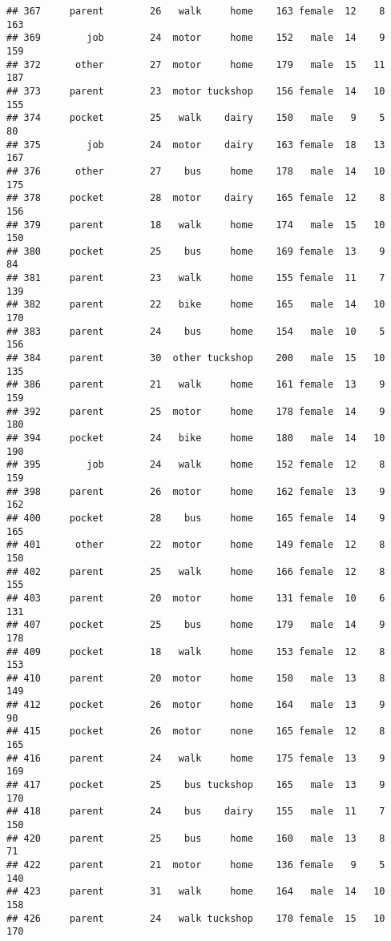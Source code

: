\documentclass[
]{article}
\begin{document}
\begin{verbatim}
## 367     parent        26   walk     home    163 female  12    8     163
## 369        job        24  motor     home    152   male  14    9     159
## 372      other        27  motor     home    179   male  15   11     187
## 373     parent        23  motor tuckshop    156 female  14   10     155
## 374     pocket        25   walk    dairy    150   male   9    5      80
## 375        job        24  motor    dairy    163 female  18   13     167
## 376      other        27    bus     home    178   male  14   10     175
## 378     pocket        28  motor    dairy    165 female  12    8     156
## 379     parent        18   walk     home    174   male  15   10     150
## 380     pocket        25    bus     home    169 female  13    9      84
## 381     parent        23   walk     home    155 female  11    7     139
## 382     parent        22   bike     home    165   male  14   10     170
## 383     parent        24    bus     home    154   male  10    5     156
## 384     parent        30  other tuckshop    200   male  15   10     135
## 386     parent        21   walk     home    161 female  13    9     159
## 392     parent        25  motor     home    178 female  14    9     180
## 394     pocket        24   bike     home    180   male  14   10     190
## 395        job        24   walk     home    152 female  12    8     159
## 398     parent        26  motor     home    162 female  13    9     162
## 400     pocket        28    bus     home    165 female  14    9     165
## 401      other        22  motor     home    149 female  12    8     150
## 402     parent        25   walk     home    166 female  12    8     155
## 403     parent        20  motor     home    131 female  10    6     131
## 407     pocket        25    bus     home    179   male  14    9     178
## 409     pocket        18   walk     home    153 female  12    8     153
## 410     parent        20  motor     home    150   male  13    8     149
## 412     pocket        26  motor     home    164   male  13    9      90
## 415     pocket        26  motor     none    165 female  12    8     165
## 416     parent        24   walk     home    175 female  13    9     169
## 417     pocket        25    bus tuckshop    165   male  13    9     170
## 418     parent        24    bus    dairy    155   male  11    7     150
## 420     parent        25    bus     home    160   male  13    8      71
## 422     parent        21  motor     home    136 female   9    5     140
## 423     parent        31   walk     home    164   male  14   10     158
## 426     parent        24   walk tuckshop    170 female  15   10     170

\end{verbatim}
\end{document}
